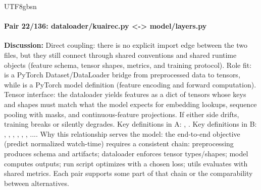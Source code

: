 \documentclass[11pt]{article}
\begin{document}
\begin{CJK*}{UTF8}{gbsn}
\paragraph{Pair 22/136: dataloader/kuairec.py <-> model/layers.py}
\textbf{Discussion:} Direct coupling: there is no explicit import edge between the two files, but they still connect through shared conventions and shared runtime objects (feature schema, tensor shapes, metrics, and training protocol). Role fit: \texttt{} is a PyTorch Dataset/DataLoader bridge from preprocessed data to tensors, while \texttt{} is a PyTorch model definition (feature encoding and forward computation). Tensor interface: the dataloader yields features as a dict of tensors whose keys and shapes must match what the model expects for embedding lookups, sequence pooling with masks, and continuous-feature projections. If either side drifts, training breaks or silently degrades. Key definitions in A: \texttt{}, \texttt{}. Key definitions in B: \texttt{}, \texttt{}, \texttt{}, \texttt{}, \texttt{}, \texttt{}, .... Why this relationship serves the model: the end-to-end objective (predict normalized watch-time) requires a consistent chain: preprocessing produces schema and artifacts; dataloader enforces tensor types/shapes; model computes outputs; run script optimizes with a chosen loss; utils evaluates with shared metrics. Each pair supports some part of that chain or the comparability between alternatives.


\end{CJK*}
\end{document}
